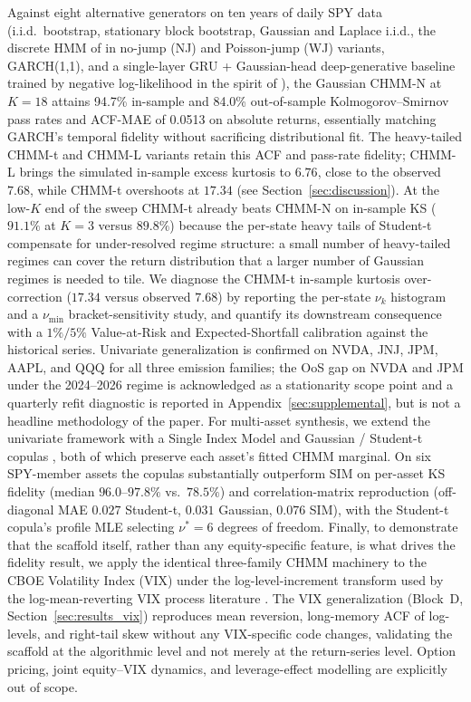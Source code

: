Against eight alternative generators on ten years of daily SPY data (i.i.d.\ bootstrap, stationary block bootstrap, Gaussian and Laplace i.i.d., the discrete HMM of \citet{alswaidan2026hybrid} in no-jump (NJ) and Poisson-jump (WJ) variants, GARCH(1,1), and a single-layer GRU + Gaussian-head deep-generative baseline trained by negative log-likelihood in the spirit of \citet{yoon2019timegan}), the Gaussian CHMM-N at $K = 18$ attains 94.7\% in-sample and 84.0\% out-of-sample Kolmogorov--Smirnov pass rates and ACF-MAE of 0.0513 on absolute returns, essentially matching GARCH's temporal fidelity without sacrificing distributional fit.
The heavy-tailed CHMM-t and CHMM-L variants retain this ACF and pass-rate fidelity; CHMM-L brings the simulated in-sample excess kurtosis to $6.76$, close to the observed $7.68$, while CHMM-t overshoots at $17.34$ (see Section~\ref{sec:discussion}).
At the low-$K$ end of the sweep CHMM-t already beats CHMM-N on in-sample KS ($91.1\%$ at $K = 3$ versus $89.8\%$) because the per-state heavy tails of Student-t compensate for under-resolved regime structure: a small number of heavy-tailed regimes can cover the return distribution that a larger number of Gaussian regimes is needed to tile.
We diagnose the CHMM-t in-sample kurtosis over-correction ($17.34$ versus observed $7.68$) by reporting the per-state $\nu_k$ histogram and a $\nu_{\min}$ bracket-sensitivity study, and quantify its downstream consequence with a $1\%/5\%$ Value-at-Risk and Expected-Shortfall calibration against the historical series.
Univariate generalization is confirmed on NVDA, JNJ, JPM, AAPL, and QQQ for all three emission families; the OoS gap on NVDA and JPM under the 2024--2026 regime is acknowledged as a stationarity scope point and a quarterly refit diagnostic is reported in Appendix~\ref{sec:supplemental}, but is not a headline methodology of the paper.
For multi-asset synthesis, we extend the univariate framework with a Single Index Model \cite{sharpe1963simplified} and Gaussian / Student-t copulas \cite{sklar1959fonctions, demarta2005tcopula, mcneil2015quantitative}, both of which preserve each asset's fitted CHMM marginal.
On six SPY-member assets the copulas substantially outperform SIM on per-asset KS fidelity (median $96.0$--$97.8\%$ vs.\ $78.5\%$) and correlation-matrix reproduction (off-diagonal MAE $0.027$ Student-t, $0.031$ Gaussian, $0.076$ SIM), with the Student-t copula's profile MLE selecting $\nu^{*} = 6$ degrees of freedom.
Finally, to demonstrate that the scaffold itself, rather than any equity-specific feature, is what drives the fidelity result, we apply the identical three-family CHMM machinery to the CBOE Volatility Index (VIX) under the log-level-increment transform used by the log-mean-reverting VIX process literature \cite{papanicolaou2014regime, dotsis2007empirical, kaeck2013stochastic}.
The VIX generalization (Block~D, Section~\ref{sec:results_vix}) reproduces mean reversion, long-memory ACF of log-levels, and right-tail skew without any VIX-specific code changes, validating the scaffold at the algorithmic level and not merely at the return-series level.
Option pricing, joint equity--VIX dynamics, and leverage-effect modelling are explicitly out of scope.

